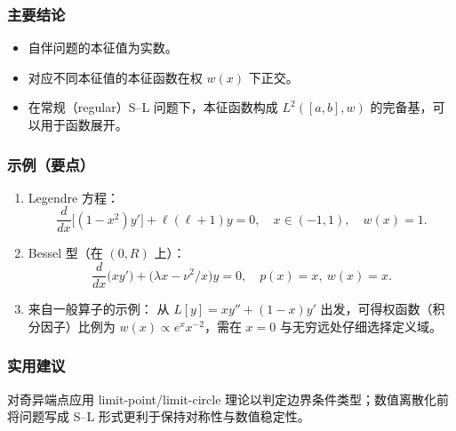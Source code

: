 \subsubsection{主要结论}
\begin{itemize}
    \item 自伴问题的本征值为实数。
    \item 对应不同本征值的本征函数在权 $w(x)$ 下正交。
    \item 在常规（regular）S--L 问题下，本征函数构成 $L^2([a,b],w)$ 的完备基，可以用于函数展开。
\end{itemize}

\subsubsection{示例（要点）}
\begin{enumerate}
    \item Legendre 方程：
    \[\frac{d}{dx}\big[(1-x^2)y'\big]+\ell(\ell+1)y=0,\quad x\in(-1,1),\quad w(x)=1.\]
    \item Bessel 型（在 $(0,R)$ 上）：
    \[\frac{d}{dx}\big(x y'\big)+\big(\lambda x-\nu^2/x\big)y=0,\quad p(x)=x,\ w(x)=x.\]
    \item 来自一般算子的示例：
    从 $L[y]=x y''+(1-x)y'$ 出发，可得权函数（积分因子）比例为 $w(x)\propto e^{x}x^{-2}$，需在 $x=0$ 与无穷远处仔细选择定义域。
\end{enumerate}

\subsubsection{实用建议}
对奇异端点应用 limit-point/limit-circle 理论以判定边界条件类型；数值离散化前将问题写成 S--L 形式更利于保持对称性与数值稳定性。

